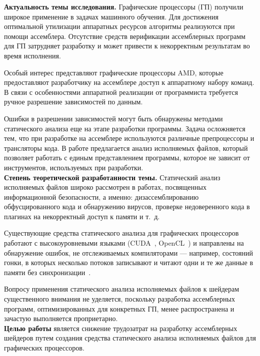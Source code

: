 \documentclass[a4paper,14pt]{extarticle}
\newcommand{\topic}[1]{\textbf{#1.}}
\begin{document}
\topic{Актуальность темы исследования} Графические процессоры (ГП) получили широкое применение
в задачах машинного обучения. Для достижения оптимальной утилизации аппаратных ресурсов
алгоритмы реализуются при помощи ассемблера. Отсутствие средств верификации ассемблерных
программ для ГП затрудняет разработку и может привести к некорректным результатам во время исполнения.

Особый интерес представляют графические процессоры AMD, которые предоставляют разработчику
на ассемблере доступ к аппаратному набору команд. В связи с особенностями аппаратной
реализации от программиста требуется ручное разрешение зависимостей по данным.

Ошибки в разрешении зависимостей могут быть обнаружены методами статического анализа
еще на этапе разработки программы. Задача осложняется тем, что при разработке
на ассемблере используются различные препроцессоры и трансляторы кода. В работе
предлагается анализ исполняемых файлов, который позволяет работать с единым
представлением программы, которое не зависит от инструментов, используемых при разработки.\\

\topic{Степень теоретической разработанности темы} Статический анализ исполняемых файлов
широко рассмотрен в работах, посвященных информационной безопасности, а именно:
дизассемблированию обфусцированного кода и обнаружению вирусов,
проверке недоверенного кода в плагинах на некорректный доступ к памяти и т.~д.~\cite{static-analysis-binary}

Существующие средства статического анализа для графических процессоров работают с
высокоуровневыми языками (CUDA~\cite{cuda}, OpenCL~\cite{opencl}) и направлены на обнаружение ошибок,
не отслеживаемых компиляторами — например, состояний гонки, в которых несколько потоков
записывают и читают одни и те же данные в памяти без синхронизации~\cite{gpu-static-verification}.

Вопросу применения статического анализа исполняемых файлов к шейдерам существенного внимания
не уделяется, поскольку разработка ассемблерных программ, оптимизированных для конкретных ГП,
менее распространена и зачастую выполняется проприетарно.\\

\textbf{Целью работы} является снижение трудозатрат на разработку ассемблерных шейдеров
путем создания средства статического анализа исполняемых файлов для графических процессоров.\\
\end{document}
